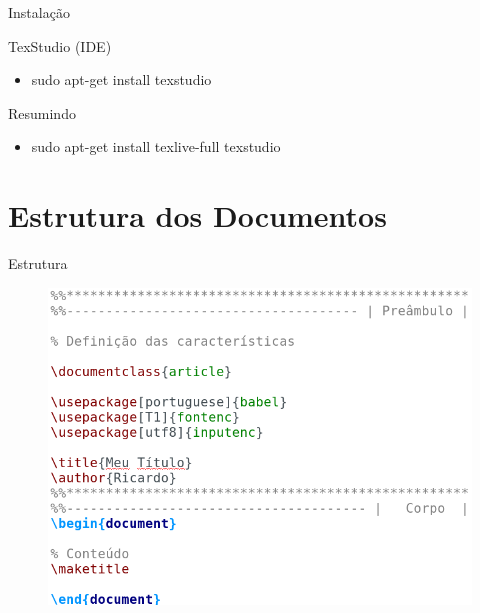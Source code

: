 \documentclass{beamer}
\begin{document}
\begin{frame}{Instalação}

	\begin{block}{TexStudio (IDE)}
		\begin{itemize}
			\item sudo apt-get install texstudio
		\end{itemize}
	\end{block}
	
	\pause

	\begin{block}{Resumindo}
		\begin{itemize}
			\item sudo apt-get install texlive-full texstudio 
		\end{itemize}
	\end{block}

\end{frame}


\section{Estrutura dos Documentos}

\begin{frame}{Estrutura}

	\begin{figure}[!htb]
		\centering
		\includegraphics[scale=.4]{estrutura.png}
	\end{figure}

	

\end{frame}
\end{document}
